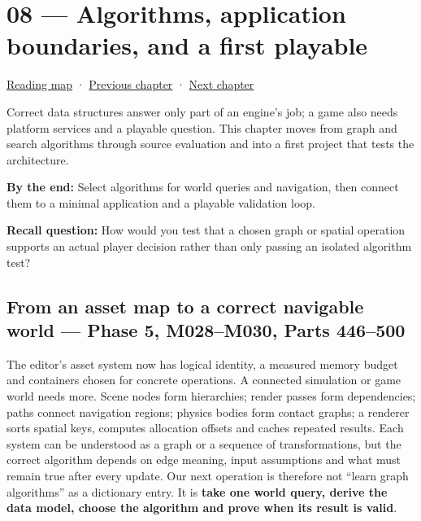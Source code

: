 \hypertarget{05-engine-i-ch008}{}
\chapter{08 --- Algorithms, application boundaries, and a first playable}\label{05-engine-i-ch008-algorithms-application-boundaries-and-a-first-playable}

\hyperref[volume-reading-map]{Reading map} · \hyperref[05-engine-i-ch007]{Previous chapter} · \hyperref[05-engine-i-ch009]{Next chapter}

Correct data structures answer only part of an engine's job; a game also needs platform services and a playable question. This chapter moves from graph and search algorithms through source evaluation and into a first project that tests the architecture.

\textbf{By the end:} Select algorithms for world queries and navigation, then connect them to a minimal application and a playable validation loop.

\textbf{Recall question:} How would you test that a chosen graph or spatial operation supports an actual player decision rather than only passing an isolated algorithm test?

\section{From an asset map to a correct navigable world --- Phase 5, M028--M030, Parts 446--500}\label{05-engine-i-ch008-from-an-asset-map-to-a-correct-navigable-world-phase-5-m028m030-parts-446500}

The editor's asset system now has logical identity, a measured memory budget and containers chosen for concrete operations. A connected simulation or game world needs more. Scene nodes form hierarchies; render passes form dependencies; paths connect navigation regions; physics bodies form contact graphs; a renderer sorts spatial keys, computes allocation offsets and caches repeated results. Each system can be understood as a graph or a sequence of transformations, but the correct algorithm depends on edge meaning, input assumptions and what must remain true after every update. Our next operation is therefore not ``learn graph algorithms'' as a dictionary entry. It is \textbf{take one world query, derive the data model, choose the algorithm and prove when its result is valid}.

